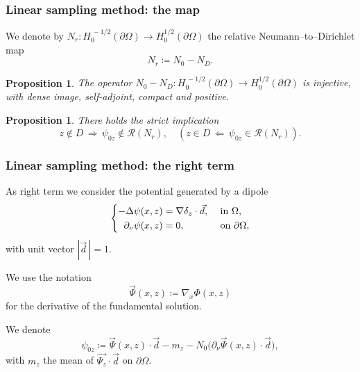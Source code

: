 \documentclass[10pt]{beamer}
\newtheorem{proposition}[subsection]{Proposition}
\theoremstyle{plain}
\theoremstyle{plain}
\begin{document}
\begin{frame}
 \frametitle{Linear sampling method: the map}
We denote by ${N_r}:H_0^{\,-1/2}(\partial \Omega)\to H_0^{1/2}(\partial \Omega)$
the {\color{blue} relative} Neumann--to--Dirichlet map
\begin{equation}
 {N_r} \coloneqq {N_0} - {N_D}.
\end{equation}
  \begin{proposition}
  The operator ${N_0} - {N_D}:H_0^{\,-1/2}(\partial \Omega)\to H_0^{1/2}(\partial \Omega)$ 
  is injective, with dense image, self-adjoint, compact and positive.
 \end{proposition}
 \begin{proposition}
There holds the strict implication
\begin{equation}
 z\notin D \, \Longrightarrow \,\psi_{0z}\notin\mathcal{R}({N_r}), \quad(z\in D \, \Longleftarrow \,\psi_{0z}\in\mathcal{R}({N_r})).
\end{equation} 
\end{proposition}

\end{frame}
\begin{frame}
 \frametitle{Linear sampling method: the right term}
  As right term we consider the potential generated by a dipole
 \begin{equation}
 \left\{
 \begin{aligned}
   -\Delta \psi(x,z) &= \nabla\delta_{z} \cdot \vec{d}, && \textup{ in }\Omega ,\\
   \partial_\nu\psi(x,z) &= 0, &&\textup{ on }\partial \Omega,
 \end{aligned}
 \right.
 \end{equation}
 with unit vector $|\vec{d}\,|=1$.
 \par
 We use the notation
 \begin{equation}
 \vec{\Psi}(x,z)\coloneqq\nabla_x\Phi(x,z) 
 \end{equation}
 for the derivative of the fundamental solution.
 \begin{definition}
 \label{def:lsm-psi}
 We denote
 \begin{equation}
 \psi_{0z} \coloneqq \vec{\Psi}(x,z)\cdot\vec{d} - m_z - N_0\bigl(\partial_\nu \vec{\Psi}(x,z) \cdot \vec{d}\bigr),
  \end{equation}
  with $m_z$ the mean of $\vec{\Psi_z}\cdot\vec{d}$ on $\partial \Omega$.
 \end{definition}
\end{frame}
\end{document}
